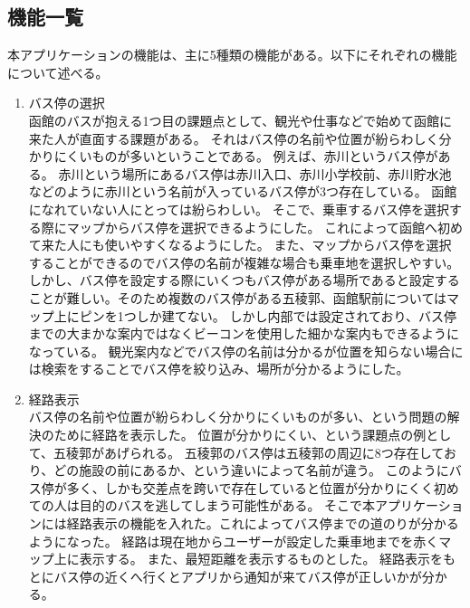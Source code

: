\documentclass[openany,11pt,papersize]{jsbook}
\begin{document}
\subsection{機能一覧}
本アプリケーションの機能は、主に5種類の機能がある。以下にそれぞれの機能について述べる。
\begin{enumerate}

\item バス停の選択\\
函館のバスが抱える1つ目の課題点として、観光や仕事などで始めて函館に来た人が直面する課題がある。
それはバス停の名前や位置が紛らわしく分かりにくいものが多いということである。
例えば、赤川というバス停がある。
赤川という場所にあるバス停は赤川入口、赤川小学校前、赤川貯水池などのように赤川という名前が入っているバス停が3つ存在している。
函館になれていない人にとっては紛らわしい。
そこで、乗車するバス停を選択する際にマップからバス停を選択できるようにした。
これによって函館へ初めて来た人にも使いやすくなるようにした。
また、マップからバス停を選択することができるのでバス停の名前が複雑な場合も乗車地を選択しやすい。
しかし、バス停を設定する際にいくつもバス停がある場所であると設定することが難しい。そのため複数のバス停がある五稜郭、函館駅前についてはマップ上にピンを1つしか建てない。
しかし内部では設定されており、バス停までの大まかな案内ではなくビーコンを使用した細かな案内もできるようになっている。
観光案内などでバス停の名前は分かるが位置を知らない場合には検索をすることでバス停を絞り込み、場所が分かるようにした。

\item 経路表示\mbox{}\\
バス停の名前や位置が紛らわしく分かりにくいものが多い、という問題の解決のために経路を表示した。
位置が分かりにくい、という課題点の例として、五稜郭があげられる。
五稜郭のバス停は五稜郭の周辺に8つ存在しており、どの施設の前にあるか、という違いによって名前が違う。
このようにバス停が多く、しかも交差点を跨いで存在していると位置が分かりにくく初めての人は目的のバスを逃してしまう可能性がある。
そこで本アプリケーションには経路表示の機能を入れた。これによってバス停までの道のりが分かるようになった。
経路は現在地からユーザーが設定した乗車地までを赤くマップ上に表示する。
また、最短距離を表示するものとした。
経路表示をもとにバス停の近くへ行くとアプリから通知が来てバス停が正しいかが分かる。


\end{enumerate}
\end{document}
